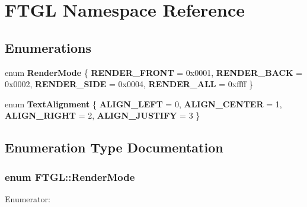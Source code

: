 \section{FTGL Namespace Reference}
\label{namespaceFTGL}
\subsection*{Enumerations}
\begin{DoxyCompactItemize}
\item 
enum {\bf RenderMode} \{ {\bf RENDER\_\-FRONT} =  0x0001, 
{\bf RENDER\_\-BACK} =  0x0002, 
{\bf RENDER\_\-SIDE} =  0x0004, 
{\bf RENDER\_\-ALL} =  0xffff
 \}
\item 
enum {\bf TextAlignment} \{ {\bf ALIGN\_\-LEFT} =  0, 
{\bf ALIGN\_\-CENTER} =  1, 
{\bf ALIGN\_\-RIGHT} =  2, 
{\bf ALIGN\_\-JUSTIFY} =  3
 \}
\end{DoxyCompactItemize}


\subsection{Enumeration Type Documentation}
\subsubsection[{RenderMode}]{\setlength{\rightskip}{0pt plus 5cm}enum {\bf FTGL::RenderMode}}\label{namespaceFTGL_a9916822cb1247bd2e1aae26f7bfec74e}
\begin{Desc}
\item[Enumerator: ]\par
\begin{description}
\item[{\em 
RENDER\_\-FRONT\label{namespaceFTGL_a9916822cb1247bd2e1aae26f7bfec74ea682a1ee1dff8218153646cfbe570bdae}
}]\item[{\em 
RENDER\_\-BACK\label{namespaceFTGL_a9916822cb1247bd2e1aae26f7bfec74ea13191d43484e1bfe32598e8cb894cef9}
}]\item[{\em 
RENDER\_\-SIDE\label{namespaceFTGL_a9916822cb1247bd2e1aae26f7bfec74ea5ce274c9f80d8a48fbe026329885cf92}
}]\item[{\em 
RENDER\_\-ALL\label{namespaceFTGL_a9916822cb1247bd2e1aae26f7bfec74ea2966ccc38996af16a67387177a8c6a62}
}]\end{description}
\end{Desc}



